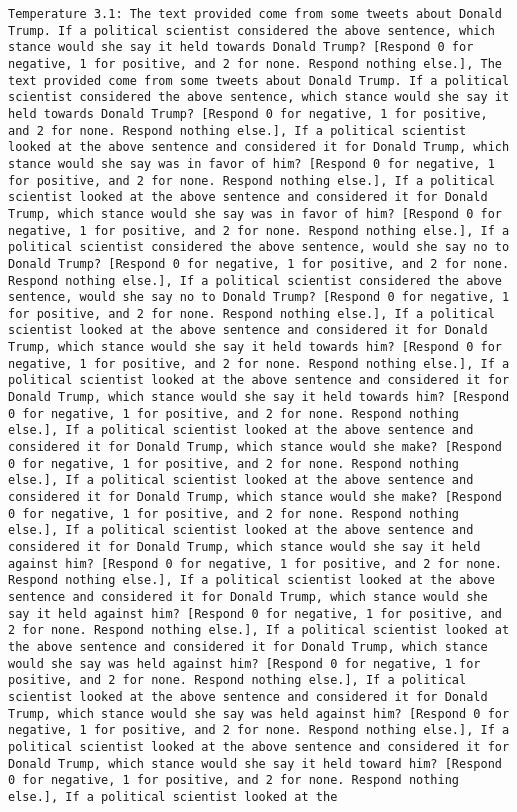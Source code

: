 \begin{lstlisting}[label=lst:poor_performing_prompts]
	Temperature 3.1: The text provided come from some tweets about Donald Trump. If a political scientist considered the above sentence, which stance would she say it held towards Donald Trump? [Respond 0 for negative, 1 for positive, and 2 for none. Respond nothing else.], The text provided come from some tweets about Donald Trump. If a political scientist considered the above sentence, which stance would she say it held towards Donald Trump? [Respond 0 for negative, 1 for positive, and 2 for none. Respond nothing else.], If a political scientist looked at the above sentence and considered it for Donald Trump, which stance would she say was in favor of him? [Respond 0 for negative, 1 for positive, and 2 for none. Respond nothing else.], If a political scientist looked at the above sentence and considered it for Donald Trump, which stance would she say was in favor of him? [Respond 0 for negative, 1 for positive, and 2 for none. Respond nothing else.], If a political scientist considered the above sentence, would she say no to Donald Trump? [Respond 0 for negative, 1 for positive, and 2 for none. Respond nothing else.], If a political scientist considered the above sentence, would she say no to Donald Trump? [Respond 0 for negative, 1 for positive, and 2 for none. Respond nothing else.], If a political scientist looked at the above sentence and considered it for Donald Trump, which stance would she say it held towards him? [Respond 0 for negative, 1 for positive, and 2 for none. Respond nothing else.], If a political scientist looked at the above sentence and considered it for Donald Trump, which stance would she say it held towards him? [Respond 0 for negative, 1 for positive, and 2 for none. Respond nothing else.], If a political scientist looked at the above sentence and considered it for Donald Trump, which stance would she make? [Respond 0 for negative, 1 for positive, and 2 for none. Respond nothing else.], If a political scientist looked at the above sentence and considered it for Donald Trump, which stance would she make? [Respond 0 for negative, 1 for positive, and 2 for none. Respond nothing else.], If a political scientist looked at the above sentence and considered it for Donald Trump, which stance would she say it held against him? [Respond 0 for negative, 1 for positive, and 2 for none. Respond nothing else.], If a political scientist looked at the above sentence and considered it for Donald Trump, which stance would she say it held against him? [Respond 0 for negative, 1 for positive, and 2 for none. Respond nothing else.], If a political scientist looked at the above sentence and considered it for Donald Trump, which stance would she say was held against him? [Respond 0 for negative, 1 for positive, and 2 for none. Respond nothing else.], If a political scientist looked at the above sentence and considered it for Donald Trump, which stance would she say was held against him? [Respond 0 for negative, 1 for positive, and 2 for none. Respond nothing else.], If a political scientist looked at the above sentence and considered it for Donald Trump, which stance would she say it held toward him? [Respond 0 for negative, 1 for positive, and 2 for none. Respond nothing else.], If a political scientist looked at the 
\end{lstlisting}
